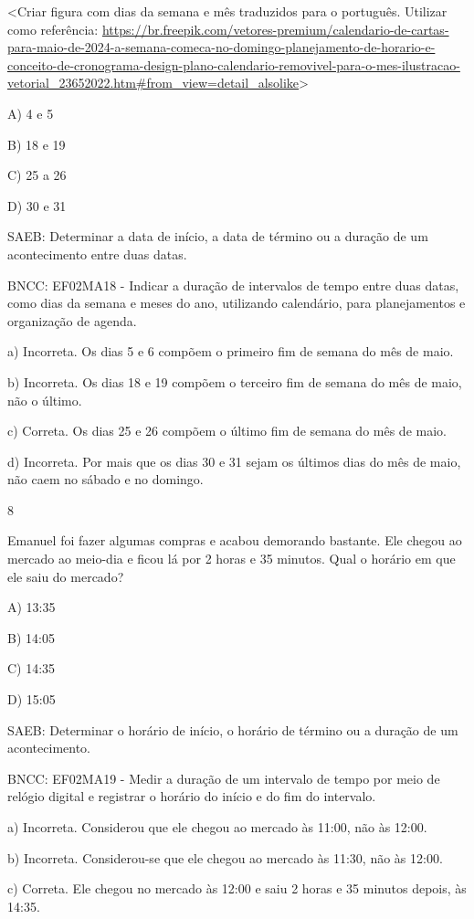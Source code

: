 \begin{escolha}
\begin{escolha}
{{{{\textless{}Criar figura com dias da semana e mês traduzidos para o
português. Utilizar como referência:
\url{https://br.freepik.com/vetores-premium/calendario-de-cartas-para-maio-de-2024-a-semana-comeca-no-domingo-planejamento-de-horario-e-conceito-de-cronograma-design-plano-calendario-removivel-para-o-mes-ilustracao-vetorial_23652022.htm\#from_view=detail_alsolike}\textgreater{}

A) 4 e 5

B) 18 e 19

C) 25 a 26

D) 30 e 31

SAEB: Determinar a data de início, a data de término ou a
duração de um acontecimento entre duas datas.

BNCC: EF02MA18 - Indicar a duração de intervalos de tempo entre
duas datas, como dias da semana e meses do ano, utilizando calendário,
para planejamentos e organização de agenda.

a) Incorreta. Os dias 5 e 6 compõem o primeiro fim de semana do mês de maio.

b) Incorreta. Os dias 18 e 19 compõem o terceiro fim de semana do mês de maio, não o último.

c) Correta. Os dias 25 e 26 compõem o último fim de semana do mês de maio.

d) Incorreta. Por mais que os dias 30 e 31 sejam os últimos dias do mês
de maio, não caem no sábado e no domingo.

\num{8}

Emanuel foi fazer algumas compras e acabou demorando bastante. Ele chegou ao mercado ao meio-dia e ficou lá por 2 horas e 35 minutos. Qual
o horário em que ele saiu do mercado?

A) 13:35

B) 14:05

C) 14:35

D) 15:05

SAEB: Determinar o horário de início, o horário de término ou a
duração de um acontecimento.

BNCC: EF02MA19 - Medir a duração de um intervalo de tempo por meio de
relógio digital e registrar o horário do início e do fim do intervalo.

a) Incorreta. Considerou que ele chegou ao mercado às 11:00, não às 12:00.

b) Incorreta. Considerou-se que ele chegou ao mercado às 11:30, não às 12:00.

c) Correta. Ele chegou no mercado às 12:00 e saiu 2 horas e 35 minutos
depois, às 14:35.

}}}}
\end{escolha}
\end{escolha}
